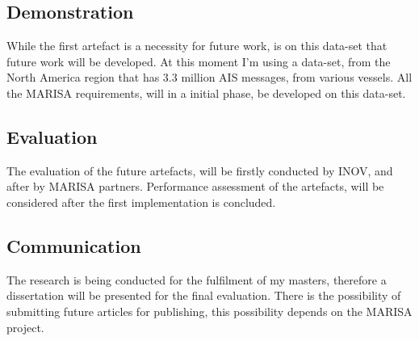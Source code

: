 \subsection{Demonstration}
While the first artefact is a necessity for future work, is on this data-set that future work will be developed. At this moment I'm using a data-set, from the North America region that has 3.3 million AIS messages, from various vessels.
All the MARISA requirements, will in a initial phase, be developed on this data-set.
\subsection{Evaluation}
The evaluation of the future artefacts, will be firstly conducted by INOV, and after by MARISA partners.
Performance assessment of the artefacts, will be considered after the first implementation is concluded.

\subsection{Communication} 
The research is being conducted for the fulfilment of my masters, therefore a dissertation will be presented for the final evaluation. There is the possibility of submitting future articles for publishing, this possibility depends on the MARISA project.
